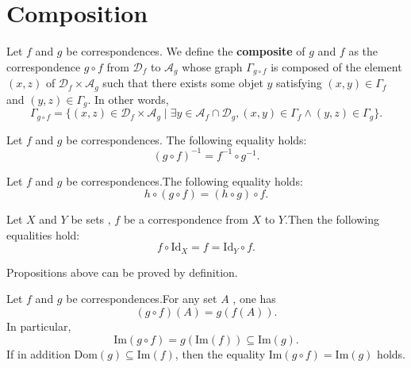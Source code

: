 \section{Composition}
\begin{definitionenv}
    Let $f$ and $g$ be correspondences. We define the \textbf{composite } of $g$ and $f$ as the correspondence $g\circ f$ from $\mathscr{D}_f$  to $\mathscr{A}_g$ whose graph $\Gamma_{g\circ f }$ is composed of the element $(x, z)$ of $\mathscr{D}_f\times \mathscr{A}_g$ such that there exists some objet $y$ satisfying $(x, y)\in \Gamma_f $ and $(y, z)\in \Gamma_g$. In other words, 
    $$\Gamma_{g\circ f }=\{(x, z)\in \mathscr{D}_f\times \mathscr{A}_g\mid \exists y\in \mathscr{A}_f\cap\mathscr{D}_g, (x, y)\in \Gamma_f \wedge (y, z)\in \Gamma_g\}.$$
\end{definitionenv}
\begin{propositionenv}
    Let $f$ and $g$ be correspondences. The following equality holds:
    \begin{equation}
        (g\circ f)^{-1}=f^{-1}\circ g^{-1}.
    \end{equation}
\end{propositionenv}
\begin{propositionenv}\label{proposition3.4.2}
    Let $f$ and $g$ be correspondences.The following equality holds:
    \begin{equation}
        h\circ (g\circ f)=(h\circ g)\circ f.
    \end{equation}
\end{propositionenv}
\begin{propositionenv}\label{proposition3.4.3}
    Let $X$ and $Y$ be sets , $f$ be a correspondence from $X$ to $Y$.Then the following equalities hold:
    $$f\circ \mathrm{Id}_X=f=\mathrm{Id}_Y\circ f.$$
\end{propositionenv}
Propositions above can be proved by definition.
\begin{propositionenv}\label{proposition3.4.4}
    Let $f$ and $g$ be correspondences.For any set $A$ , one has 
    $$(g\circ f)(A)=g(f(A)).$$
    In particular, 
    $$\mathrm{Im}(g\circ f)=g(\mathrm{Im}(f))\subseteq \mathrm{Im}(g).$$
    If in addition $\mathrm{Dom}(g)\subseteq \mathrm{Im}(f)$,  then the equality $\mathrm{Im}(g\circ f)=\mathrm{Im}(g)$ holds.
\end{propositionenv}
